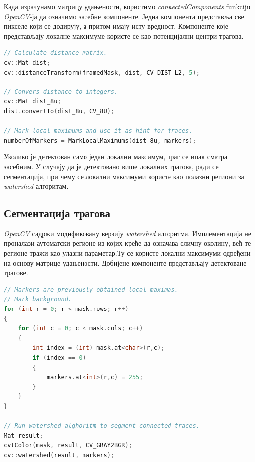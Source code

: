 \documentclass[11pt,a4paper,serbian,oneside]{book}
\begin{document}
Када израчунамо матрицу удањености, користимо \textit{connectedComponents} funkciju \textit{OpenCV}-ја да означимо засебне компоненте. Једна компонента представља све пикселе који се додирују, а притом имају исту вредност. Компоненте које представљају локалне максимуме користе се као потенцијални центри трагова.

 \begin{lstlisting}[language=C++,label=lst:local_maxima,caption=Проналажење централних региона трагова]
// Calculate distance matrix.
cv::Mat dist;
cv::distanceTransform(framedMask, dist, CV_DIST_L2, 5);

// Convers distance to integers.
cv::Mat dist_8u;
dist.convertTo(dist_8u, CV_8U);

// Mark local maximums and use it as hint for traces.
numberOfMarkers = MarkLocalMaximums(dist_8u, markers);
\end{lstlisting}

Уколико је детектован само један локални максимум, траг се ипак сматра засебним. У случају да је детектовано више локалних трагова, ради се сегментација, при чему се  локални максимуми користе као полазни региони за \textit{watershed} алгоритам.

\subsection{Сегментација трагова}

\textit{OpenCV} садржи модификовану верзију \textit{watershed} алгоритма. Имплементација не про\-на\-ла\-зи аутоматски регионе из којих креће да означава сличну околину, већ те регионе тражи као улазни параметар.Ту се користе локални максимуми одређени на основу матрице удањености. Добијене компоненте представљају детектоване трагове.

 \begin{lstlisting}[language=C++,label=lst:grayscaleOtsu,caption=Сегментација трагова]
// Markers are previously obtained local maximas.
// Mark background.
for (int r = 0; r < mask.rows; r++)
{
    for (int c = 0; c < mask.cols; c++)
    {
        int index = (int) mask.at<char>(r,c);
        if (index == 0)
        {
            markers.at<int>(r,c) = 255;
        }
    }
}

// Run watershed alghoritm to segment connected traces.
Mat result;
cvtColor(mask, result, CV_GRAY2BGR);
cv::watershed(result, markers);
\end{lstlisting}
\end{document}
